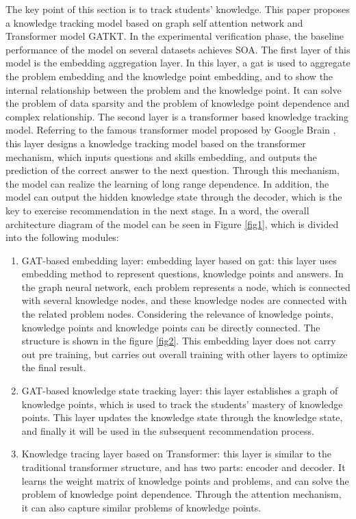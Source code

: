 The key point of this section is to track students' knowledge. This paper proposes a knowledge tracking model based on graph self attention network and Transformer model GATKT. In the experimental verification phase, the baseline performance of the model on several datasets achieves SOA. The first layer of this model is the embedding aggregation layer. In this layer, a gat is used to aggregate the problem embedding and the knowledge point embedding, and to show the internal relationship between the problem and the knowledge point. It can solve the problem of data sparsity and the problem of knowledge point dependence and complex relationship. The second layer is a transformer based knowledge tracking model. Referring to the famous transformer model proposed by Google Brain \cite{vaswani2017attention}, this layer designs a knowledge tracking model based on the transformer mechanism, which inputs questions and skills embedding, and outputs the prediction of the correct answer to the next question. Through this mechanism, the model can realize the learning of long range dependence. In addition, the model can output the hidden knowledge state through the decoder, which is the key to exercise recommendation in the next stage. In a word, the overall architecture diagram of the model can be seen in Figure \ref{fig1}, which is divided into the following modules:
\begin{enumerate}
  \item GAT-based embedding layer: embedding layer based on gat: this layer uses embedding method to represent questions, knowledge points and answers. In the graph neural network, each problem represents a node, which is connected with several knowledge nodes, and these knowledge nodes are connected with the related problem nodes. Considering the relevance of knowledge points, knowledge points and knowledge points can be directly connected. The structure is shown in the figure \ref{fig2}. This embedding layer does not carry out pre training, but carries out overall training with other layers to optimize the final result.
  \item GAT-based knowledge state tracking layer: this layer establishes a graph of knowledge points, which is used to track the students' mastery of knowledge points. This layer updates the knowledge state through the knowledge state, and finally it will be used in the subsequent recommendation process.
  \item Knowledge tracing layer based on Transformer: this layer is similar to the traditional transformer structure, and has two parts: encoder and decoder. It learns the weight matrix of knowledge points and problems, and can solve the problem of knowledge point dependence. Through the attention mechanism, it can also capture similar problems of knowledge points.
\end{enumerate}

